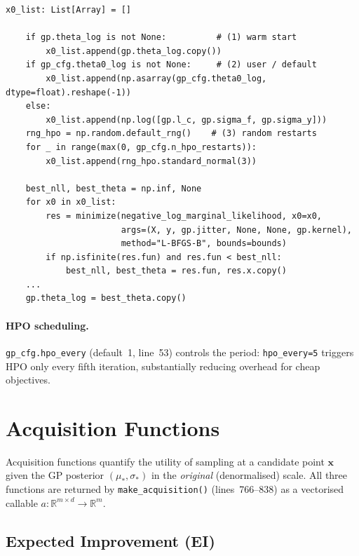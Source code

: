\documentclass[11pt,a4paper]{article}
\newcommand{\bx}{\bm{x}}
\newcommand{\R}{\mathbb{R}}
\theoremstyle{remark}
\newcommand{\codeline}[1]{line~#1}
\newcommand{\coderange}[2]{lines~#1--#2}
\newcommand{\codefn}[1]{\texttt{#1()}}
\begin{document}
\begin{lstlisting}[firstnumber=637, caption=Multi-restart loop in \codefn{optimize\_gp\_hyperparams}]
    x0_list: List[Array] = []

    if gp.theta_log is not None:          # (1) warm start
        x0_list.append(gp.theta_log.copy())
    if gp_cfg.theta0_log is not None:     # (2) user / default
        x0_list.append(np.asarray(gp_cfg.theta0_log, dtype=float).reshape(-1))
    else:
        x0_list.append(np.log([gp.l_c, gp.sigma_f, gp.sigma_y]))
    rng_hpo = np.random.default_rng()    # (3) random restarts
    for _ in range(max(0, gp_cfg.n_hpo_restarts)):
        x0_list.append(rng_hpo.standard_normal(3))

    best_nll, best_theta = np.inf, None
    for x0 in x0_list:
        res = minimize(negative_log_marginal_likelihood, x0=x0,
                       args=(X, y, gp.jitter, None, None, gp.kernel),
                       method="L-BFGS-B", bounds=bounds)
        if np.isfinite(res.fun) and res.fun < best_nll:
            best_nll, best_theta = res.fun, res.x.copy()
    ...
    gp.theta_log = best_theta.copy()
\end{lstlisting}

\paragraph{HPO scheduling.}
\texttt{gp\_cfg.hpo\_every} (default~1, \codeline{53}) controls the period:
\texttt{hpo\_every=5} triggers HPO only every fifth iteration, substantially
reducing overhead for cheap objectives.

\section{Acquisition Functions}
\label{sec:acq}

Acquisition functions quantify the utility of sampling at a candidate point
$\bx$ given the GP posterior $(\mu_*, \sigma_*)$ in the \emph{original}
(denormalised) scale.  All three functions are returned by
\codefn{make\_acquisition} (\coderange{766}{838}) as a vectorised callable
$a: \R^{m\times d} \to \R^m$.

\subsection{Expected Improvement (EI)}
\end{document}
